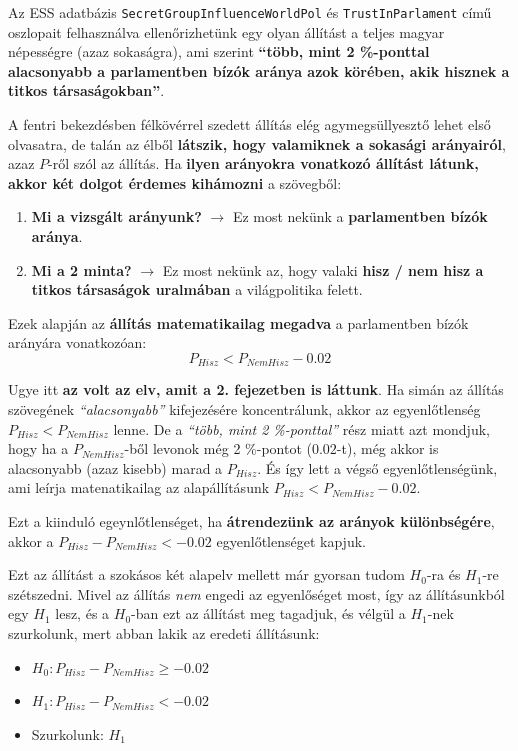 \documentclass[
]{book}
\providecommand{\tightlist}{%
  \setlength{\itemsep}{0pt}\setlength{\parskip}{0pt}}
\begin{document}
Az ESS adatbázis \texttt{SecretGroupInfluenceWorldPol} és \texttt{TrustInParlament} című oszlopait felhasználva ellenőrizhetünk egy olyan állítást a teljes magyar népességre (azaz sokaságra), ami szerint \textbf{``több, mint 2 \%-ponttal alacsonyabb a parlamentben bízók aránya azok körében, akik hisznek a titkos társaságokban''}.

A fentri bekezdésben félkövérrel szedett állítás elég agymegsüllyesztő lehet első olvasatra, de talán az élből \textbf{látszik, hogy valamiknek a sokasági arányairól}, azaz \(P\)-ről szól az állítás. Ha \textbf{ilyen arányokra vonatkozó állítást látunk, akkor két dolgot érdemes kihámozni} a szövegből:

\begin{enumerate}
\def\labelenumi{\arabic{enumi}.}
\tightlist
\item
  \textbf{Mi a vizsgált arányunk?} \(\rightarrow\) Ez most nekünk a \textbf{parlamentben bízók aránya}.
\item
  \textbf{Mi a 2 minta?} \(\rightarrow\) Ez most nekünk az, hogy valaki \textbf{hisz / nem hisz a titkos társaságok uralmában} a világpolitika felett.
\end{enumerate}

Ezek alapján az \textbf{állítás matematikailag megadva} a parlamentben bízók arányára vonatkozóan: \[P_{Hisz} < P_{NemHisz} - 0.02\]

Ugye itt \textbf{az volt az elv, amit a 2. fejezetben is láttunk}. Ha simán az állítás szövegének \emph{``alacsonyabb''} kifejezésére koncentrálunk, akkor az egyenlőtlenség \(P_{Hisz} < P_{NemHisz}\) lenne. De a \emph{``több, mint 2 \%-ponttal''} rész miatt azt mondjuk, hogy ha a \(P_{NemHisz}\)-ből levonok még 2 \%-pontot (\(0.02\)-t), még akkor is alacsonyabb (azaz kisebb) marad a \(P_{Hisz}\). És így lett a végső egyenlőtlenségünk, ami leírja matenatikailag az alapállításunk \(P_{Hisz} < P_{NemHisz} - 0.02\).

Ezt a kiinduló egeynlőtlenséget, ha \textbf{átrendezünk az arányok különbségére}, akkor a \(P_{Hisz} - P_{NemHisz} < -0.02\) egyenlőtlenséget kapjuk.

Ezt az állítást a szokásos két alapelv mellett már gyorsan tudom \(H_0\)-ra és \(H_1\)-re szétszedni. Mivel az állítás \emph{nem} engedi az egyenlőséget most, így az állításunkból egy \(H_1\) lesz, és a \(H_0\)-ban ezt az állítást meg tagadjuk, és vélgül a \(H_1\)-nek szurkolunk, mert abban lakik az eredeti állításunk:

\begin{itemize}
\tightlist
\item
  \(H_0:P_{Hisz} - P_{NemHisz} \geq -0.02\)
\item
  \(H_1:P_{Hisz} - P_{NemHisz} < -0.02\)
\item
  Szurkolunk: \(H_1\)
\end{itemize}
\end{document}
